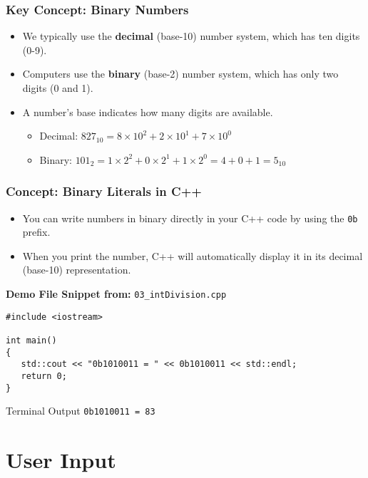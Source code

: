 \documentclass{beamer}
\begin{document}
\begin{frame}
\frametitle{Key Concept: Binary Numbers}
\begin{itemize}
    \item We typically use the \textbf{decimal} (base-10) number system, which has ten digits (0-9).
    \item Computers use the \textbf{binary} (base-2) number system, which has only two digits (0 and 1).
    \item A number's base indicates how many digits are available.
    \begin{itemize}
        \item Decimal: $827_{10} = 8 \times 10^2 + 2 \times 10^1 + 7 \times 10^0$
        \item Binary: $101_2 = 1 \times 2^2 + 0 \times 2^1 + 1 \times 2^0 = 4 + 0 + 1 = 5_{10}$
    \end{itemize}
\end{itemize}
\end{frame}

\begin{frame}[fragile]
\frametitle{Concept: Binary Literals in C++}
\begin{itemize}
    \item You can write numbers in binary directly in your C++ code by using the \texttt{0b} prefix.
    \item When you print the number, C++ will automatically display it in its decimal (base-10) representation.
\end{itemize}
\vspace{1em}
\textbf{Demo File Snippet from:} \texttt{03\_intDivision.cpp}
\begin{verbatim}
#include <iostream>

int main()
{
   std::cout << "0b1010011 = " << 0b1010011 << std::endl;
   return 0;
}
\end{verbatim}
\pause
\begin{block}{Terminal Output}
\texttt{0b1010011 = 83}
\end{block}
\end{frame}

\section{User Input}
\end{document}
